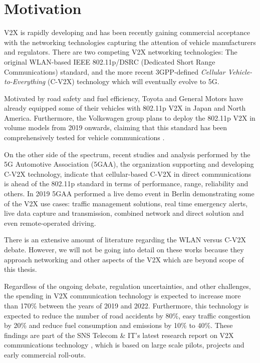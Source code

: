 \section{Motivation}
\label{section:motivation}
V2X is rapidly developing and has been recently gaining commercial acceptance with the networking technologies capturing the attention of vehicle manufacturers and regulators. There are two competing V2X networking technologies: The original WLAN-based IEEE 802.11p/DSRC (Dedicated Short Range Communications) standard, and the more recent 3GPP-defined \textit{Cellular Vehicle-to-Everything} (C-V2X) technology which will eventually evolve to 5G.

Motivated by road safety and fuel efficiency, Toyota and General Motors have already equipped some of their vehicles with 802.11p V2X in Japan and North America. Furthermore, the Volkswagen group plans to deploy the 802.11p V2X in volume models from 2019 onwards, claiming that this standard has been comprehensively tested for vehicle communications \cite{Volkswagen}. 

On the other side of the spectrum, recent studies and analysis \cite{5gaa1} \cite{5gaa2} performed by the 5G Automotive Association (5GAA), the organization supporting and developing C-V2X technology, indicate that cellular-based C-V2X in direct communications is ahead of the 802.11p standard in terms of performance, range, reliability and others. In 2019 5GAA performed a live demo event in Berlin \cite{5gaa3} demonstrating some of the V2X use cases: traffic management solutions, real time emergency alerts, live data capture and transmission, combined network and direct solution and even remote-operated driving.

There is an extensive amount of literature regarding the WLAN versus C-V2X debate. However, we will not be going into detail on these works because they approach networking and other aspects of the V2X which are beyond scope of this thesis.

Regardless of the ongoing debate, regulation uncertainties, and other challenges, the spending in V2X communication technology is expected to increase more than 170\% between the years of 2019 and 2022. Furthermore, this technology is expected to reduce the number of road accidents by 80\%, easy traffic congestion by 20\% and reduce fuel consumption and emissions by 10\% to 40\%. These findings are part of the SNS Telecom \& IT’s latest research report on V2X communications technology \cite{Report}, which is based on large scale pilots, projects and early commercial roll-outs. 


